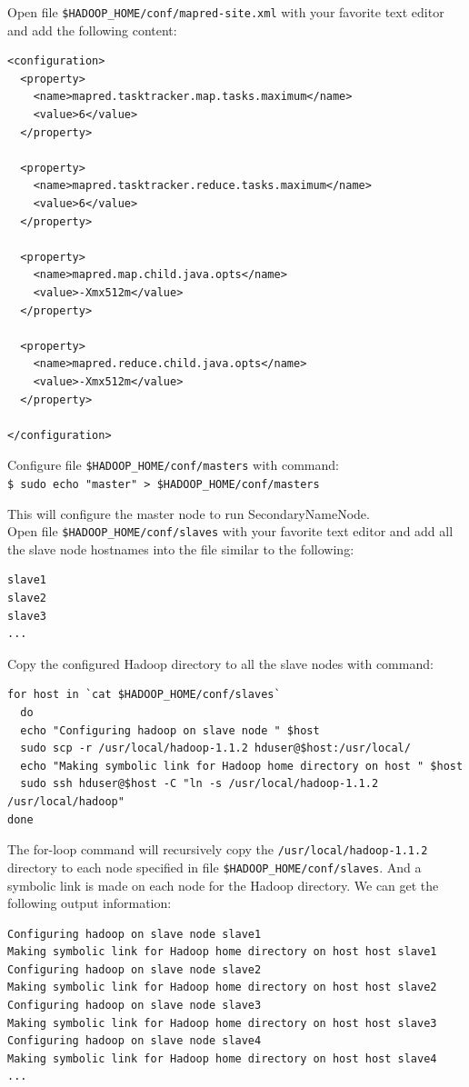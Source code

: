 Open file \verb|$HADOOP_HOME/conf/mapred-site.xml| with your favorite text editor and add the following content:
\lstset{style=bashstyle}
\begin{lstlisting}[caption=Content to add to file mapred-site.xml]
<configuration>
  <property>
    <name>mapred.tasktracker.map.tasks.maximum</name>
    <value>6</value>
  </property>

  <property>
    <name>mapred.tasktracker.reduce.tasks.maximum</name>
    <value>6</value>
  </property>

  <property>
    <name>mapred.map.child.java.opts</name>
    <value>-Xmx512m</value>
  </property>

  <property>
    <name>mapred.reduce.child.java.opts</name>
    <value>-Xmx512m</value>
  </property>

</configuration>
\end{lstlisting}

Configure file \verb|$HADOOP_HOME/conf/masters| with command: \\
\verb|$ sudo echo "master" > $HADOOP_HOME/conf/masters|

This will configure the master node to run SecondaryNameNode. \\
Open file \verb|$HADOOP_HOME/conf/slaves| with your favorite text editor and add all the slave node hostnames into the file similar to the following:
\lstset{style=bashstyle}
\begin{lstlisting}[caption=Content of file slaves]
slave1
slave2
slave3
...
\end{lstlisting}

Copy the configured Hadoop directory to all the slave nodes with command:
\lstset{style=bashstyle}
\begin{lstlisting}
for host in `cat $HADOOP_HOME/conf/slaves`
  do
  echo "Configuring hadoop on slave node " $host
  sudo scp -r /usr/local/hadoop-1.1.2 hduser@$host:/usr/local/
  echo "Making symbolic link for Hadoop home directory on host " $host
  sudo ssh hduser@$host -C "ln -s /usr/local/hadoop-1.1.2 /usr/local/hadoop"
done
\end{lstlisting}

The for-loop command will recursively copy the \verb|/usr/local/hadoop-1.1.2| directory to each node specified in file \verb|$HADOOP_HOME/conf/slaves|. And a symbolic link is made on each node for the Hadoop directory. We can get the following output information:
\lstset{style=bashstyle}
\begin{lstlisting}[caption=Output of running the above command]
Configuring hadoop on slave node slave1
Making symbolic link for Hadoop home directory on host host slave1
Configuring hadoop on slave node slave2
Making symbolic link for Hadoop home directory on host host slave2
Configuring hadoop on slave node slave3
Making symbolic link for Hadoop home directory on host host slave3
Configuring hadoop on slave node slave4
Making symbolic link for Hadoop home directory on host host slave4
...
\end{lstlisting}

